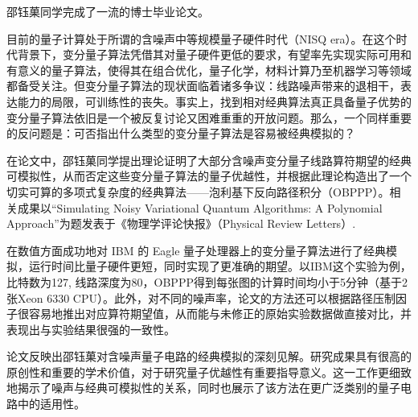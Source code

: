 
\begin{comments}

  邵钰菓同学完成了一流的博士毕业论文。

目前的量子计算处于所谓的含噪声中等规模量子硬件时代（NISQ era）。在这个时代背景下，变分量子算法凭借其对量子硬件更低的要求，有望率先实现实际可用和有意义的量子算法，使得其在组合优化，量子化学，材料计算乃至机器学习等领域都备受关注。但变分量子算法的现状面临着诸多争议：线路噪声带来的退相干，表达能力的局限，可训练性的丧失。事实上，找到相对经典算法真正具备量子优势的变分量子算法依旧是一个被反复讨论又困难重重的开放问题。那么，一个同样重要的反问题是：可否指出什么类型的变分量子算法是容易被经典模拟的？

在论文中，邵钰菓同学提出理论证明了大部分含噪声变分量子线路算符期望的经典可模拟性，从而否定这些变分量子算法的量子优越性，并根据此理论构造出了一个切实可算的多项式复杂度的经典算法——泡利基下反向路径积分（OBPPP）。相关成果以“Simulating Noisy Variational Quantum Algorithms: A Polynomial Approach”为题发表于《物理学评论快报》（Physical Review Letters）.

在数值方面成功地对 IBM 的 Eagle 量子处理器上的变分量子算法进行了经典模拟，运行时间比量子硬件更短，同时实现了更准确的期望。以IBM这个实验为例，比特数为127, 线路深度为80，OBPPP得到每张图的计算时间均小于5分钟（基于2张Xeon 6330 CPU）。此外，对不同的噪声率，论文的方法还可以根据路径压制因子很容易地推出对应算符期望值，从而能与未修正的原始实验数据做直接对比，并表现出与实验结果很强的一致性。

论文反映出邵钰菓对含噪声量子电路的经典模拟的深刻见解。研究成果具有很高的原创性和重要的学术价值，对于研究量子优越性有重要指导意义。这一工作更细致地揭示了噪声与经典可模拟性的关系，同时也展示了该方法在更广泛类别的量子电路中的适用性。


\end{comments}
